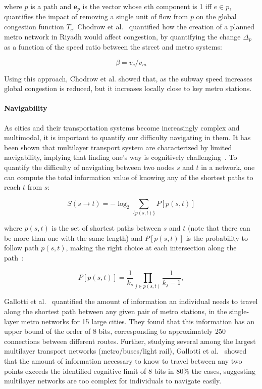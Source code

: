where $p$ is a path and $\textbf{e}_p$ is the vector whose $e$th component is 1 iff $e \in p$, quantifies the impact of removing a single unit of flow from $p$ on the global congestion function $T_c$. 
Chodrow et al.~\cite{chodrow2016congestion} quantified how the creation of a planned metro network in Riyadh would affect congestion, by quantifying the change $\Delta_p$ as a function of the speed ratio between the street and metro systems:

\begin{equation}
    \beta = v_{c}/v_{m}
\end{equation}

Using this approach, Chodrow et al. showed that, as the subway speed increases global congestion is reduced, but it increases locally close to key metro stations.

\paragraph{Navigability} 
As cities and their transportation systems become increasingly complex and multimodal, it is important to quantify our difficulty navigating in them. It has been shown that multilayer transport system are characterized by limited navigability, implying that finding one's way is cognitively challenging~\cite{gallotti2016limits}. To quantify the difficulty of navigating between two nodes $s$ and $t$ in a network, one can compute the total information value of knowing any of the shortest paths to reach $t$ from $s$:


\begin{equation}
S(s \rightarrow t) = - \log_2 \sum_{\{p(s,t)\}} P[p(s,t)]
\end{equation}

where  ${p(s, t)}$ is the set of shortest paths between $s$ and $t$ (note that there can be more than one with the same length) and $P[p(s,t)]$ is the probability to follow path $p(s,t)$, making the right choice at each intersection along the path~\cite{rosvall2005networks}:

\begin{equation}
    P[p(s,t)]=\frac{1}{k_s}\prod_{j\in p(s,t)}\frac{1}{k_j-1}, 
\end{equation}

Gallotti et al.~\cite{gallotti2016limits} quantified the amount of information an individual needs to travel along the shortest path between any given pair of metro stations, in the single-layer metro networks for 15 large cities. They found that this information has an upper bound of the order of 8 bits, corresponding to approximately 250 connections between different routes. Further, studying several among the largest multilayer transport networks (metro/buses/light rail), Gallotti et al.~\cite{gallotti2016limits} showed that the amount of information necessary to know to travel between any two points exceeds the identified cognitive limit of 8 bits in 80\% the cases, suggesting multilayer networks are too complex for individuals to navigate easily.


